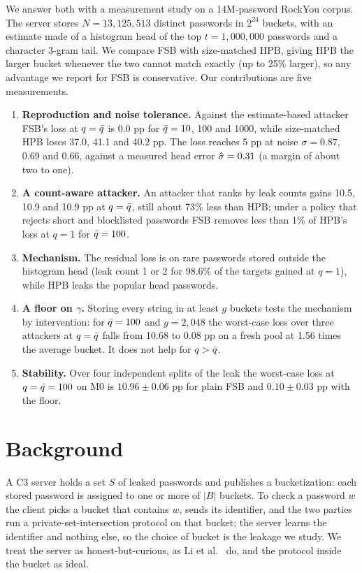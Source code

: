 We answer both with a measurement study on a 14M-password RockYou corpus. The server stores $N=13{,}125{,}513$ distinct passwords in $2^{24}$ buckets, with an estimate made of a histogram head of the top $t=1{,}000{,}000$ passwords and a character 3-gram tail. We compare FSB with size-matched HPB, giving HPB the larger bucket whenever the two cannot match exactly (up to 25\% larger), so any advantage we report for FSB is conservative. Our contributions are five measurements.
\begin{enumerate}
\item \textbf{Reproduction and noise tolerance.} Against the estimate-based attacker FSB's loss at $q=\bar q$ is 0.0 pp for $\bar q=10$, 100 and 1000, while size-matched HPB loses 37.0, 41.1 and 40.2 pp. The loss reaches 5 pp at noise $\sigma=0.87$, 0.69 and 0.66, against a measured head error $\hat\sigma=0.31$ (a margin of about two to one).
\item \textbf{A count-aware attacker.} An attacker that ranks by leak counts gains 10.5, 10.9 and 10.9 pp at $q=\bar q$, still about 73\% less than HPB; under a policy that rejects short and blocklisted passwords FSB removes less than 1\% of HPB's loss at $q=1$ for $\bar q=100$.
\item \textbf{Mechanism.} The residual loss is on rare passwords stored outside the histogram head (leak count 1 or 2 for 98.6\% of the targets gained at $q=1$), while HPB leaks the popular head passwords.
\item \textbf{A floor on $\gamma$.} Storing every string in at least $g$ buckets tests the mechanism by intervention: for $\bar q=100$ and $g=2{,}048$ the worst-case loss over three attackers at $q=\bar q$ falls from 10.68 to 0.08 pp on a fresh pool at 1.56 times the average bucket. It does not help for $q>\bar q$.
\item \textbf{Stability.} Over four independent splits of the leak the worst-case loss at $q=\bar q=100$ on M0 is $10.96\pm0.06$ pp for plain FSB and $0.10\pm0.03$ pp with the floor.
\end{enumerate}

\section{Background}

A C3 server holds a set $S$ of leaked passwords and publishes a bucketization: each stored password is assigned to one or more of $|B|$ buckets. To check a password $w$ the client picks a bucket that contains $w$, sends its identifier, and the two parties run a private-set-intersection protocol on that bucket; the server learns the identifier and nothing else, so the choice of bucket is the leakage we study. We treat the server as honest-but-curious, as Li et al.~\cite{li2019} do, and the protocol inside the bucket as ideal.

